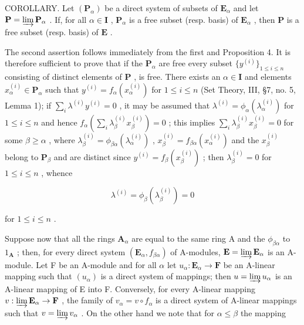 COROLLARY. Let \((\mathbf{P}_{\alpha})\) be a direct system of subsets of \(\mathbf{E}_{\alpha}\) and let \(\mathbf{P} = \varinjlim \mathbf{P}_{\alpha}\) . If, for all \(\alpha \in \mathbf{I}\) , \(\mathbf{P}_{\alpha}\) is a free subset (resp. basis) of \(\mathbf{E}_{\alpha}\) , then \(\mathbf{P}\) is a free subset (resp. basis) of \(\mathbf{E}\) .

The second assertion follows immediately from the first and Proposition 4. It is therefore sufficient to prove that if the \(\mathbf{P}_{\alpha}\) are free every subset \(\{y^{(i)}\}_{1\leqslant i\leqslant n}\) consisting of distinct elements of \(\mathbf{P}\) , is free. There exists an \(\alpha \in \mathbf{I}\) and elements \(x_{\alpha}^{(i)}\in \mathbf{P}_{\alpha}\) such that \(y^{(i)} = f_{\alpha}(x_{\alpha}^{(i)})\) for \(1\leqslant i\leqslant n\) (Set Theory, III, §7, no. 5, Lemma 1); if \(\sum_{i}\lambda^{(i)}y^{(i)} = 0\) , it may be assumed that \(\lambda^{(i)} = \phi_{\alpha}(\lambda_{\alpha}^{(i)})\) for \(1\leqslant i\leqslant n\) and hence \(f_{\alpha}\left(\sum_{i}\lambda_{\beta}^{(i)}x_{\beta}^{(i)}\right) = 0\) ; this implies \(\sum_{i}\lambda_{\beta}^{(i)}x_{\beta}^{(i)} = 0\) for some \(\beta \geqslant \alpha\) , where \(\lambda_{\beta}^{(i)} = \phi_{\beta \alpha}(\lambda_{\alpha}^{(i)})\) , \(x_{\beta}^{(i)} = f_{\beta \alpha}(x_{\alpha}^{(i)})\) and the \(x_{\beta}^{(i)}\) belong to \(\mathbf{P}_{\beta}\) and are distinct since \(y^{(i)} = f_{\beta}(x_{\beta}^{(i)})\) ; then \(\lambda_{\beta}^{(i)} = 0\) for \(1\leqslant i\leqslant n\) , whence

\[
\lambda^ {(i)} = \phi_ {\beta} (\lambda_ {\beta} ^ {(i)}) = 0
\]

for \(1 \leqslant i \leqslant n\) .

Suppose now that all the rings \(\mathbf{A}_{\alpha}\) are equal to the same ring A and the \(\phi_{\beta \alpha}\) to \(1_{\mathbf{A}}\) ; then, for every direct system \((\mathbf{E}_{\alpha}, f_{\beta \alpha})\) of A-modules, \(\mathbf{E} = \varinjlim \mathbf{E}_{\alpha}\) is an A-module. Let F be an A-module and for all \(\alpha\) let \(u_{\alpha}: \mathbf{E}_{\alpha} \to \mathbf{F}\) be an A-linear mapping such that \((u_{\alpha})\) is a direct system of mappings; then \(u = \varinjlim u_{\alpha}\) is an A-linear mapping of E into F. Conversely, for every A-linear mapping \(v: \varinjlim \mathbf{E}_{\alpha} \to \mathbf{F}\) , the family of \(v_{\alpha} = v \circ f_{\alpha}\) is a direct system of A-linear mappings such that \(v = \varinjlim v_{\alpha}\) . On the other hand we note that for \(\alpha \leqslant \beta\) the mapping

